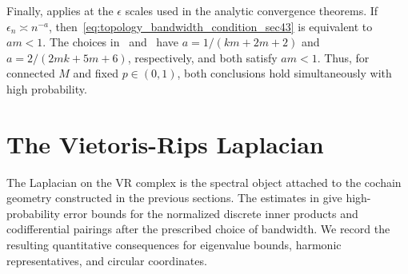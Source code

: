 \documentclass[11pt,reqno]{amsproc}
\numberwithin{equation}{section}
\theoremstyle{definition}
\theoremstyle{plain}
\begin{document}
    Finally,  applies at the $\epsilon$ scales used in the analytic convergence theorems. If $\epsilon_n\asymp n^{-a}$, then~\eqref{eq:topology_bandwidth_condition_sec43} is equivalent to $am<1$. The choices in~ and~ have $a=1/(km+2m+2)$ and $a=2/(2mk+5m+6)$, respectively, and both satisfy $am<1$. Thus, for connected $M$ and fixed $p \in (0,1)$, both conclusions hold simultaneously with high probability. 

    \section{The Vietoris-Rips Laplacian} \label{sec:rips_laplacian}

    The Laplacian on the VR complex is the spectral object attached to the cochain geometry constructed in the previous sections.  The estimates in  give high-probability error bounds for the normalized discrete inner products and codifferential pairings after the prescribed choice of bandwidth.  We record the resulting quantitative consequences for eigenvalue bounds, harmonic representatives, and circular coordinates.
\end{document}
